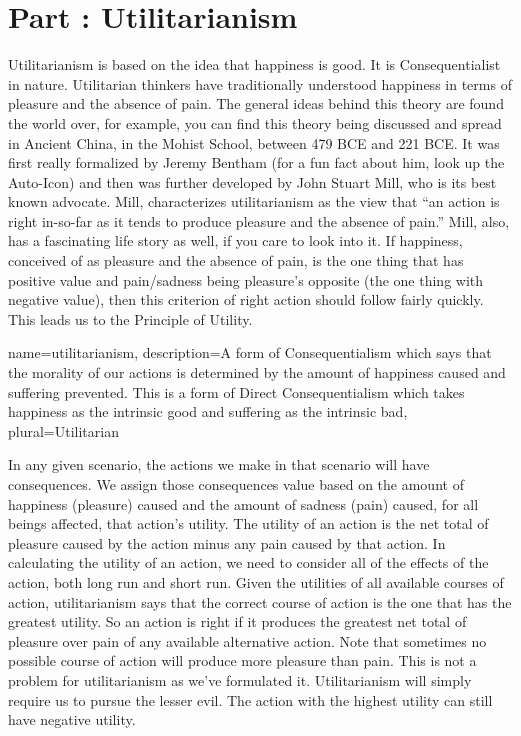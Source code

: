 \chapter{Part \thechapcount: Utilitarianism}\setcounter{seccount}{1}

Utilitarianism is based on the idea that happiness is good. It is Consequentialist in nature. Utilitarian thinkers have traditionally understood happiness in terms of pleasure and the absence of pain. The general ideas behind this theory are found the world over, for example, you can find this theory being discussed and spread in Ancient China, in the Mohist School, between 479 BCE and 221 BCE. It was first really formalized by Jeremy Bentham (for a fun fact about him, look up the Auto-Icon) and then was further developed by John Stuart Mill, who is its best known advocate. Mill, characterizes \gls{utilitarianism} as the view that “an action is right in-so-far as it tends to produce pleasure and the absence of pain.” Mill, also, has a fascinating life story as well, if you care to look into it.  If happiness, conceived of as pleasure and the absence of pain, is the one thing that has positive value and pain/sadness being pleasure's opposite (the one thing with negative value), then this criterion of right action should follow fairly quickly. This leads us to the Principle of Utility.

{
  name=utilitarianism,
  description={A form of Consequentialism which says that the morality of our actions is determined by the amount of happiness caused and suffering prevented. This is a form of Direct Consequentialism which takes happiness as the intrinsic good and suffering as the intrinsic bad},
  plural=Utilitarian
}


In any given scenario, the actions we make in that scenario will have consequences. We assign those consequences value based on the amount of happiness (pleasure) caused and the amount of sadness (pain) caused, for all beings affected, that action's utility. The utility of an action is the net total of pleasure caused by the action minus any pain caused by that action. In calculating the utility of an action, we need to consider all of the effects of the action, both long run and short run. Given the utilities of all available courses of action, utilitarianism says that the correct course of action is the one that has the greatest utility. So an action is right if it produces the greatest net total of pleasure over pain of any available alternative action. Note that sometimes no possible course of action will produce more pleasure than pain. This is not a problem for utilitarianism as we’ve formulated it. Utilitarianism will simply require us to pursue the lesser evil. The action with the highest utility can still have negative utility.

